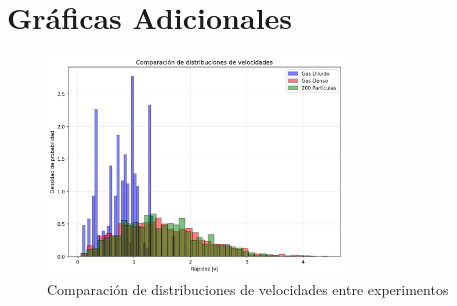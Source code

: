 \documentclass[12pt,a4paper]{article}
\begin{document}
\section{Gráficas Adicionales}

\begin{figure}[H]
\centering
\includegraphics[width=0.7\textwidth]{../results/comparacion_velocidades.png}
\caption{Comparación de distribuciones de velocidades entre experimentos}
\end{figure}
\end{document}
